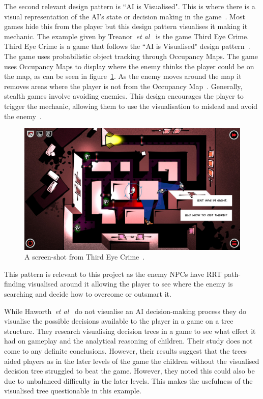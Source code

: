 \documentclass[journal]{IEEEtran}
\begin{document}
	The second relevant design pattern is ``AI is Visualised".  This is where there is a visual representation of the AI's state or decision making in the game~\cite{treanor2015}. Most games hide this from the player but this design pattern visualises it making it mechanic.  
	The example given by Treanor~\textit{et al}~\cite{treanor2015} is the game Third Eye Crime.  Third Eye Crime is a game that follows the ``AI is Visualised" design pattern~\cite{Isla2014, game:ThirdEyeCrime}. The game uses probabilistic object tracking through Occupancy Maps. The game uses Occupancy Maps to display where the enemy thinks the player could be on the map, as can be seen in figure~\ref{image:ThirdEyeCrime}. As the enemy moves around the map it removes areas where the player is not from the Occupancy Map~\cite{Isla2014}.  Generally, stealth games involve avoiding enemies.  This design encourages the player to trigger the mechanic, allowing them to use the visualisation to mislead and avoid the enemy~\cite{Isla2014, game:ThirdEyeCrime}. 
	
	\begin{figure}[h]
		\includegraphics[width=1.0\linewidth]{ThirdEyeCrime.jpg}
		\caption{ A screen-shot from Third Eye Crime~\cite{game:ThirdEyeCrime}.}
		\label{image:ThirdEyeCrime}
	\end{figure}  
	
	This pattern is relevant to this project as the enemy NPCs have RRT path-finding visualised around it allowing the player to see where the enemy is searching and decide how to overcome or outsmart it.
	
	While Haworth~\textit{et al}~\cite{Haworth2010} do not visualise an AI decision-making process they do visualise the possible decisions available to the player in a game on a tree structure.   They research visualising decision trees in a game to see what effect it had on gameplay and the analytical reasoning of children.  
	Their study does not come to any definite conclusions. However, their results suggest that the trees aided players as in the later levels of the game the children without the visualised decision tree struggled to beat the game. However, they noted this could also be due to unbalanced difficulty in the later levels. This makes the usefulness of the visualised tree questionable in this example.  
	
\end{document}

